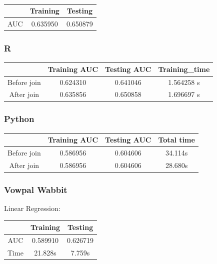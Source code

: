\documentclass[10pt]{article}
\begin{document}
\\
\begin{center}
 \begin{tabular}{|c | c | c ||} 
 \hline
 & Training & Testing\\ [0.5ex] 
 \hline\hline
AUC & 0.635950 & 0.650879\\
 \hline
\end{tabular}
\end{center}

\subsubsection{R}
\begin{center}
 \begin{tabular}{|c | c | c | c||} 
 \hline
 & Training AUC & Testing AUC & Training_time\\ [0.5ex] 
 \hline\hline
Before join & 0.624310 & 0.641046 & 1.564258 s\\
 \hline
After join & 0.635856 & 0.650858 & 1.696697 s\\ 
 \hline
\end{tabular}
\end{center}

\subsubsection{Python}
\begin{center}
 \begin{tabular}{|c | c | c | c||} 
 \hline
 & Training AUC & Testing AUC & Total time\\ [0.5ex] 
 \hline\hline
Before join & 0.586956 & 0.604606 & 34.114s\\
 \hline
After join & 0.586956 & 0.604606 & 28.680s\\ 
 \hline
\end{tabular}
\end{center}

\subsubsection{Vowpal Wabbit}

Linear Regression:\\

\begin{center}
 \begin{tabular}{|c | c | c||} 
 \hline
 & Training & Testing\\ [0.5ex] 
 \hline\hline
AUC & 0.589910 & 0.626719\\ 
 \hline
Time & 21.828s & 7.759s\\ 
 \hline
\end{tabular}
\end{center}
\end{document}
